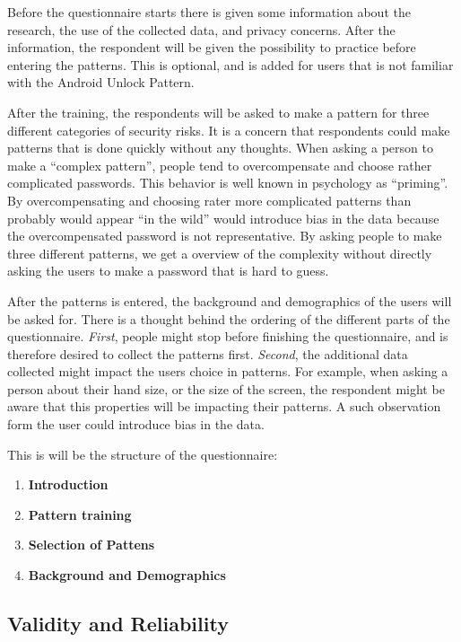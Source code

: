     Before the questionnaire starts there is given some information about the research, the use of the collected data, and privacy concerns. After the information, the respondent will be given the possibility to practice before entering the patterns. This is optional, and is added for users that is not familiar with the Android Unlock Pattern.

    After the training, the respondents will be asked to make a pattern for three different categories of security risks. It is a concern that respondents could make patterns that is done quickly without any thoughts. When asking a person to make a ``complex pattern'', people tend to overcompensate and choose rather complicated passwords. This behavior is well known in psychology as ``priming''. By overcompensating and choosing rater more complicated patterns than probably would appear ``in the wild'' would introduce bias in the data because the overcompensated password is not representative. By asking people to make three different patterns, we get a overview of the complexity without directly asking the users to make a password that is hard to guess.

    After the patterns is entered, the background and demographics of the users will be asked for. There is a thought behind the ordering of the different parts of the questionnaire. {\it First}, people might stop before finishing the questionnaire, and is therefore desired to collect the patterns first. {\it Second}, the additional data collected might impact the users choice in patterns. For example, when asking a person about their hand size, or the size of the screen, the respondent might be aware that this properties will be impacting their patterns. A such observation form the user could introduce bias in the data.

    This is will be the structure of the questionnaire:

    \begin{enumerate}
      \item {\bf Introduction}
      \item {\bf Pattern training}
      \item {\bf Selection of Pattens}
      \item {\bf Background and Demographics}
    \end{enumerate}

  \subsection{Validity and Reliability}\label{sec:validityandreliability}

